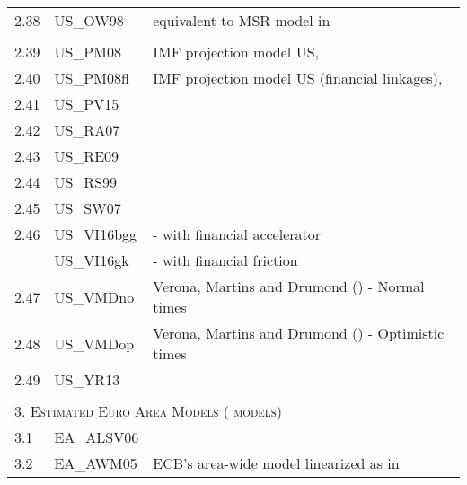 \documentclass[11pt,a4paper]{article}
\begin{document}
\begin{table}[H]
\begin{tabularx}{\textwidth}{lll}
			2.38	&	US\_OW98	&	\cite{OrphanidesWieland1998}	equivalent	to	MSR	model	in	\\			
			&	&	\cite{LevinWielandWilliams2003}	\\			
			2.39\footnotemark[1]	&	US\_PM08	&	IMF	projection	model	US,	\cite{Carabenciovetal2008}\\%
			2.40	&	US\_PM08fl	&	IMF	projection	model	US	(financial	linkages),\cite{Carabenciovetal2008}	\\			
			2.41	&	US\_PV15	&	\cite{poutineau2015financial}	\\								
			2.42	&	US\_RA07	&	\cite{Rabanal2007}	\\								
			2.43	&	US\_RE09	&	\cite{reis2009sticky}\\									
			2.44\footnotemark[1]	&	US\_RS99	&	\cite{RudebuschSvensson1999}\\%
			2.45	&	US\_SW07	&	\cite{SmetsWouters2007}	\\								
			2.46	&	US\_VI16bgg	&	\cite{villa2016} - with \cite{BernankeGertlerGilchrist1999} financial accelerator \\								
			&	US\_VI16gk &	\cite{villa2016} - with \cite{GertlerKaradi2013} financial friction  \\											
			2.47\footnotemark[1]	&	US\_VMDno	&	Verona,	Martins	and	Drumond	(\cite{Veronaetal2013})	-	Normal	times\\%
			2.48\footnotemark[1]	&	US\_VMDop	&	Verona,	Martins	and	Drumond	(\cite{Veronaetal2013})	-	Optimistic	times\\%
			2.49\footnotemark[1]	&	US\_YR13	&	\cite{rychalovska2016}\\%
			
			
			&& \\		
			\multicolumn{3}{l}{\textsc{3. Estimated Euro Area Models (\the\value{EAnumber} models)}} \\
			
			
			3.1	&	EA\_ALSV06	&	\cite{andres2006lopezsalido}	\\										
			3.2	&	EA\_AWM05	&	ECB's	area-wide	model	linearized	as	in	\cite{DieppeKuesterMcAdam2005}\\					
			

\end{tabularx}
\end{table}
\end{document}
